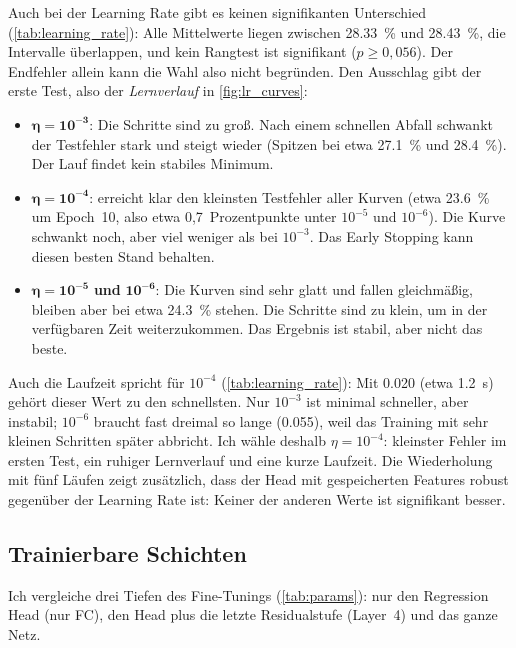 Auch bei der Learning Rate gibt es keinen signifikanten Unterschied
(\cref{tab:learning_rate}): Alle Mittelwerte liegen zwischen
\SI{28,33}{\percent} und \SI{28,43}{\percent}, die Intervalle überlappen, und
kein Rangtest ist signifikant ($p\ge0,056$). Der Endfehler allein kann die
Wahl also nicht begründen. Den Ausschlag gibt der erste Test, also der
\emph{Lernverlauf} in \cref{fig:lr_curves}:
\begin{itemize}[nosep]
  \item $\bm{\eta = 10^{-3}}$: Die Schritte sind zu groß. Nach einem schnellen
        Abfall schwankt der Testfehler stark und steigt wieder (Spitzen bei
        etwa \SI{27,1}{\percent} und \SI{28,4}{\percent}). Der Lauf findet kein
        stabiles Minimum.
  \item $\bm{\eta = 10^{-4}}$: erreicht klar den kleinsten Testfehler aller
        Kurven (etwa \SI{23,6}{\percent} um Epoch~10, also etwa
        0,7~Prozentpunkte unter $10^{-5}$ und $10^{-6}$). Die Kurve schwankt
        noch, aber viel weniger als bei $10^{-3}$. Das Early Stopping kann
        diesen besten Stand behalten.
  \item $\bm{\eta = 10^{-5}}$ \textbf{und} $\bm{10^{-6}}$: Die Kurven sind sehr
        glatt und fallen gleichmäßig, bleiben aber bei etwa
        \SI{24,3}{\percent} stehen. Die Schritte sind zu klein, um in der
        verfügbaren Zeit weiterzukommen. Das Ergebnis ist stabil, aber nicht
        das beste.
\end{itemize}
Auch die Laufzeit spricht für $10^{-4}$ (\cref{tab:learning_rate}): Mit
\SI{0,020}{\min} (etwa \SI{1,2}{\second}) gehört dieser Wert zu den
schnellsten. Nur $10^{-3}$ ist minimal schneller, aber instabil; $10^{-6}$
braucht fast dreimal so lange (\SI{0,055}{\min}), weil das Training mit sehr
kleinen Schritten später abbricht. Ich wähle deshalb $\eta = 10^{-4}$: kleinster
Fehler im ersten Test, ein ruhiger Lernverlauf und eine kurze Laufzeit. Die
Wiederholung mit fünf Läufen zeigt zusätzlich, dass der Head mit gespeicherten
Features robust gegenüber der Learning Rate ist: Keiner der anderen Werte ist
signifikant besser.

\subsection{Trainierbare Schichten}
\label{sec:layers}

Ich vergleiche drei Tiefen des Fine-Tunings (\cref{tab:params}): nur den
Regression Head (nur FC), den Head plus die letzte Residualstufe
(Layer~4) und das ganze Netz.

